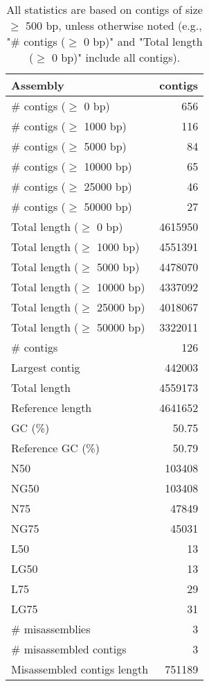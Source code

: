 \documentclass[12pt,a4paper]{article}
\begin{document}
\begin{table}[ht]
\begin{center}
\caption{All statistics are based on contigs of size $\geq$ 500 bp, unless otherwise noted (e.g., "\# contigs ($\geq$ 0 bp)" and "Total length ($\geq$ 0 bp)" include all contigs).}
\begin{tabular}{|l*{1}{|r}|}
\hline
Assembly & contigs \\ \hline
\# contigs ($\geq$ 0 bp) & 656 \\ \hline
\# contigs ($\geq$ 1000 bp) & 116 \\ \hline
\# contigs ($\geq$ 5000 bp) & 84 \\ \hline
\# contigs ($\geq$ 10000 bp) & 65 \\ \hline
\# contigs ($\geq$ 25000 bp) & 46 \\ \hline
\# contigs ($\geq$ 50000 bp) & 27 \\ \hline
Total length ($\geq$ 0 bp) & 4615950 \\ \hline
Total length ($\geq$ 1000 bp) & 4551391 \\ \hline
Total length ($\geq$ 5000 bp) & 4478070 \\ \hline
Total length ($\geq$ 10000 bp) & 4337092 \\ \hline
Total length ($\geq$ 25000 bp) & 4018067 \\ \hline
Total length ($\geq$ 50000 bp) & 3322011 \\ \hline
\# contigs & 126 \\ \hline
Largest contig & 442003 \\ \hline
Total length & 4559173 \\ \hline
Reference length & 4641652 \\ \hline
GC (\%) & 50.75 \\ \hline
Reference GC (\%) & 50.79 \\ \hline
N50 & 103408 \\ \hline
NG50 & 103408 \\ \hline
N75 & 47849 \\ \hline
NG75 & 45031 \\ \hline
L50 & 13 \\ \hline
LG50 & 13 \\ \hline
L75 & 29 \\ \hline
LG75 & 31 \\ \hline
\# misassemblies & 3 \\ \hline
\# misassembled contigs & 3 \\ \hline
Misassembled contigs length & 751189 \\ \hline

\end{tabular}
\end{center}
\end{table}
\end{document}
